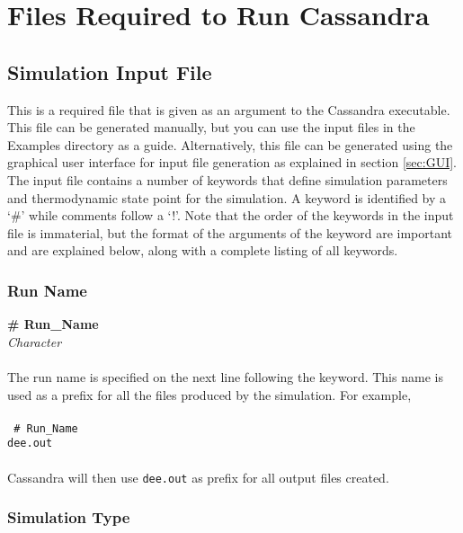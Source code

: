 \chapter{Files Required to Run Cassandra}
\label{ch:input_files}

\section{Simulation Input File} \label{sec:Input_File}
This is a required file that is given as an argument to the Cassandra
executable. This file can be generated manually, but you can use the input files in the Examples 
directory as a guide. Alternatively, this file can be generated using the graphical user interface 
for input file generation as explained in section \ref{sec:GUI}.
The input file contains a number of keywords that define simulation parameters
and thermodynamic state point for the simulation. A keyword is identified
by a `\#' while comments follow a `!'. Note that the order of the keywords in the input
file is immaterial, but the format of the arguments of the keyword are
important and are explained below, along with a complete listing of
all keywords. 
%
%
%
\subsection{Run Name}\label{sec:Run_Name}
{\bf \# Run\_Name}\\
{\it Character} \\ \\
%
The run name is specified on the next line following the keyword. This name is used as a prefix for all the files
produced by the simulation. For example,\\ \\
%
{\tt{
\# Run\_Name \\
dee.out
}} \\ \\
%
Cassandra will then use \texttt{dee.out} as prefix for all output files created.

%
%
%
\subsection{Simulation Type}\label{sec:Sim_Type}

